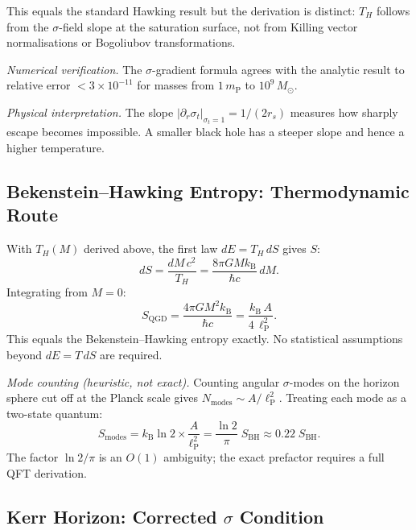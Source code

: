 \documentclass[12pt,a4paper]{article}
\newcommand{\lP}{\ell_{\mathrm{P}}}
\newcommand{\mP}{m_{\mathrm{P}}}
\newcommand{\Msun}{M_{\odot}}
\begin{document}
This equals the standard Hawking result but the derivation is distinct:
$T_H$ follows from the $\sigma$-field slope at the saturation surface,
not from Killing vector normalisations or Bogoliubov transformations.

\smallskip\noindent
\textit{Numerical verification.}
The $\sigma$-gradient formula agrees with the analytic result to relative
error $<3\times10^{-11}$ for masses from $1\,\mP$ to $10^9\,\Msun$.

\smallskip\noindent
\textit{Physical interpretation.}
The slope $|\partial_r\sigma_t|_{\sigma_t=1} = 1/(2r_s)$ measures how sharply
escape becomes impossible. A smaller black hole has a steeper slope and
hence a higher temperature.

\subsection{Bekenstein--Hawking Entropy: Thermodynamic Route}

\begin{result}
With $T_H(M)$ derived above, the first law $dE = T_H\,dS$ gives $S$:
\begin{equation}
  dS = \frac{dM\,c^2}{T_H} = \frac{8\pi G M k_{\mathrm{B}}}{\hbar c}\,dM.
\end{equation}
Integrating from $M=0$:
\begin{equation}
  \boxed{S_{\mathrm{QGD}} = \frac{4\pi G M^2 k_{\mathrm{B}}}{\hbar c}
         = \frac{k_{\mathrm{B}}\,A}{4\,\lP^2}.}
\end{equation}
This equals the Bekenstein--Hawking entropy exactly.
No statistical assumptions beyond $dE = T\,dS$ are required.
\end{result}

\noindent\textit{Mode counting (heuristic, not exact).}
Counting angular $\sigma$-modes on the horizon sphere cut off at the
Planck scale gives $N_{\mathrm{modes}}\sim A/\lP^2$.
Treating each mode as a two-state quantum:
\begin{equation}
  S_{\mathrm{modes}} = k_{\mathrm{B}}\ln2\times\frac{A}{\lP^2}
  = \frac{\ln 2}{\pi}\;S_{\mathrm{BH}}\approx 0.22\;S_{\mathrm{BH}}.
\end{equation}
The factor $\ln2/\pi$ is an $O(1)$ ambiguity; the exact prefactor
requires a full QFT derivation.

\subsection{Kerr Horizon: Corrected $\sigma$ Condition}
\end{document}
